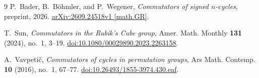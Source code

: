 \documentclass[11pt,letterpaper]{article}
\theoremstyle{definition}
\theoremstyle{remark}
\begin{document}
\begin{thebibliography}{9}
 P.~Bader, B.~B\"ohmler, and P.~Wegener,
\emph{Commutators of signed \(n\)-cycles}, preprint, 2026.
\href{https://arxiv.org/abs/2609.24518v1}{arXiv:2609.24518v1 [math.GR]}.

 T.~Sun, \emph{Commutators in the Rubik's Cube group},
Amer. Math. Monthly \textbf{131} (2024), no.~1, 3--19.
\href{https://doi.org/10.1080/00029890.2023.2263158}{doi:10.1080/00029890.2023.2263158}.

 A.~Vavpeti\v{c}, \emph{Commutators of cycles in permutation
groups}, Ars Math. Contemp. \textbf{10} (2016), no.~1, 67--77.
\href{https://doi.org/10.26493/1855-3974.430.eaf}{doi:10.26493/1855-3974.430.eaf}.
\end{thebibliography}
\end{document}
